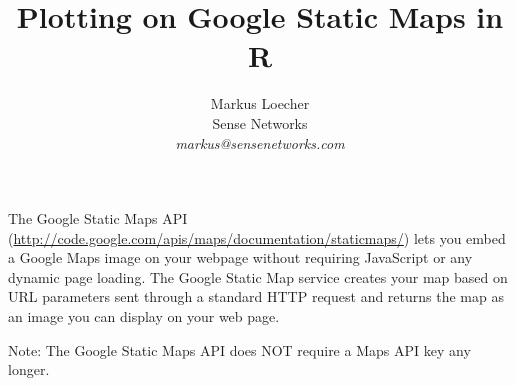 \documentclass{article}
\begin{document}

\title{Plotting on Google Static Maps in R}
\author{Markus Loecher\\  Sense Networks \\  \it{markus@sensenetworks.com}}

\maketitle
\noindent
The Google Static Maps API (\url{http://code.google.com/apis/maps/documentation/staticmaps/}) lets you embed a Google Maps image on your webpage without requiring JavaScript or any dynamic page loading. The Google Static Map service creates your map based on URL parameters sent through a standard HTTP request and returns the map as an image you can display on your web page.

\noindent Note: The Google Static Maps API does NOT require a Maps API key any longer. 
\end{document}
